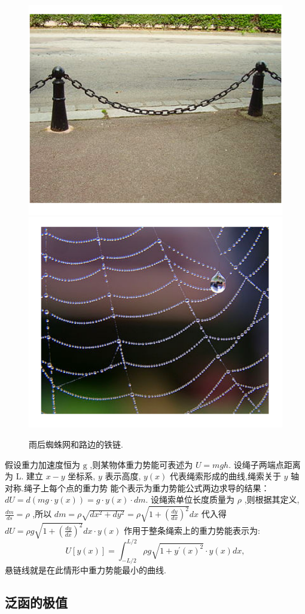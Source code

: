 \begin{itemize}
\begin{figure}
    \includegraphics[width=0.45\linewidth]{roadside.png}
    \includegraphics[width=0.45\linewidth]{cobweb.png}
    \caption{雨后蜘蛛网和路边的铁链.}
    \label{fig:catenary_example}
  \end{figure}

  假设重力加速度恒为 $\mathrm{g}$ ,则某物体重力势能可表述为 $U=m g h$. 设绳子两端点距离为 $\mathrm{L}$.
建立 $x-y$ 坐标系, $y$ 表示高度, $y(x)$ 代表绳索形成的曲线,绳索关于 $y$ 轴对称.绳子上每个点的重力势 能个表示为重力势能公式两边求导的结果： $d U=d(m g \cdot y(x))=g \cdot y(x) \cdot d m$.
设绳索单位长度质量为 $\rho$ ,则根据其定义, $\frac{d m}{d s}=\rho$ ,所以
$d m=\rho \sqrt{d x^2+d y^2}=\rho \sqrt{1+\left(\frac{d y}{d x}\right)^2} d x$
代入得 $d U=\rho g \sqrt{1+\left(\frac{d y}{d x}\right)^2} d x \cdot y(x)$
作用于整条绳索上的重力势能表示为:
$$
U[y(x)]=\int_{-L / 2}^{L / 2} \rho g \sqrt{1+y^{\prime}(x)^2} \cdot y(x) d x,
$$
悬链线就是在此情形中重力势能最小的曲线. 


\end{itemize}

\subsection{泛函的极值}

